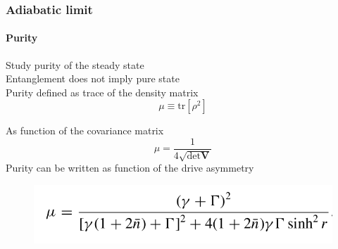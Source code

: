 \documentclass[aspectratio=43]{beamer}
\begin{document}
\begin{frame}
	
	\frametitle{Adiabatic limit}
	\framesubtitle{Purity}
	
	Study purity of the steady state\\
	Entanglement does not imply pure state\\
	
	Purity defined as trace of the density matrix
	\begin{equation}
		\mu \equiv \textrm{tr}[\rho^{2}] \nonumber
	\end{equation}	
		
	As function of the covariance matrix
	\begin{equation}
		\mu = \frac{1}{4 \sqrt{\det \textbf{V}}} \nonumber
	\end{equation}
	Purity can be written as function of the drive asymmetry 
	\begin{figure}
		\includegraphics[width = 6.5 cm]{plots/purity.png}
	\end{figure}

\end{frame}
\end{document}
